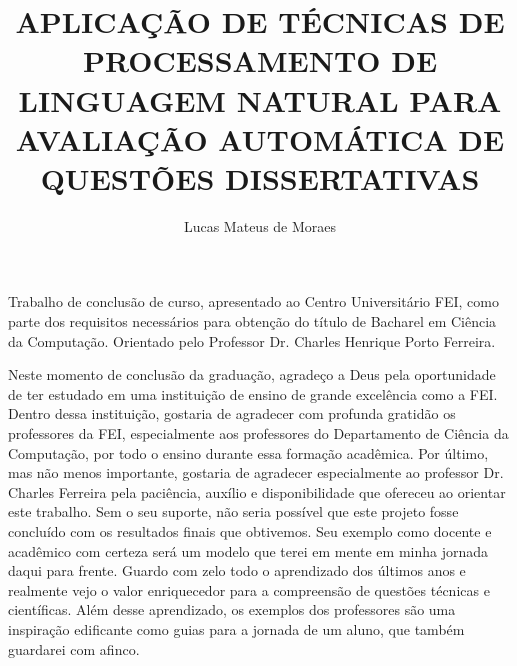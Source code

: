 \documentclass[acronym,symbols]{fei}
\author{
 Lucas Mateus de  Moraes 
}
\title{APLICAÇÃO DE TÉCNICAS DE PROCESSAMENTO DE LINGUAGEM NATURAL PARA AVALIAÇÃO AUTOMÁTICA DE QUESTÕES DISSERTATIVAS}
\begin{document}
\maketitle 

\begin{folhaderosto}
Trabalho de conclusão de curso, apresentado ao Centro Universitário FEI, como parte dos requisitos necessários para obtenção do título de Bacharel em Ciência da Computação. Orientado pelo Professor Dr. Charles Henrique Porto Ferreira.
\end{folhaderosto}



\begin{agradecimentos}
Neste momento de conclusão da graduação, agradeço a Deus pela oportunidade de ter estudado em uma instituição de ensino de grande excelência como a FEI. Dentro dessa instituição, gostaria de agradecer com profunda gratidão os professores da FEI, especialmente aos professores do Departamento de Ciência da Computação, por todo o ensino durante essa formação acadêmica. Por último, mas não menos importante, gostaria de agradecer especialmente ao professor Dr. Charles Ferreira pela paciência, auxílio e disponibilidade que ofereceu ao orientar este trabalho. Sem o seu suporte, não seria possível que este projeto fosse concluído com os resultados finais que obtivemos. Seu exemplo como docente e acadêmico com certeza será um modelo que terei em mente em minha jornada daqui para frente. Guardo com zelo todo o aprendizado dos últimos anos e realmente vejo o valor enriquecedor para a compreensão de questões técnicas e científicas. Além desse aprendizado, os exemplos dos professores são uma inspiração edificante como guias para a jornada de um aluno, que também guardarei com afinco.
\end{agradecimentos}

\begin{epigrafe}
\end{epigrafe}
\end{document}
